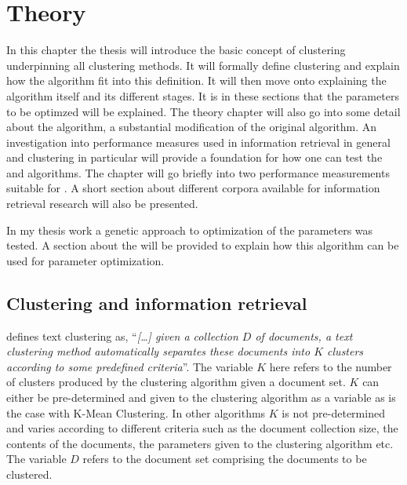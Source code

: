 
\chapter{Theory} %
\label{Theory} %

In this chapter the thesis will introduce the basic concept of clustering underpinning all clustering methods. It will formally define clustering and explain how the \STC algorithm fit into this definition. It will then move onto explaining the \STC algorithm itself and its different stages. It is in these sections that the parameters to be optimzed will be explained. The theory chapter will also go into some detail about the \CTC algorithm, a substantial modification of the original \STC algorithm. An investigation into performance measures used in information retrieval in general and clustering in particular will provide a foundation for how one can test the \STC and \CTC algorithms. The chapter will go briefly into two performance measurements suitable for \CTC. A short section about different corpora available for information retrieval research will also be presented.

In my thesis work a genetic approach to optimization of the parameters was tested. A section about the \GA will be provided to explain how this algorithm can be used for parameter optimization.

\section{Clustering and information retrieval}
\label{Clustering}
\citeauthor[][286]{Baeza-Yates2011a} defines text clustering as, ``\textit{[\dots] given a collection \(D\) of documents, a text clustering method automatically separates these documents into \(K\) clusters according to some predefined criteria}''. The variable \(K\) here refers to the number of clusters produced by the clustering algorithm given a document set. \(K\) can either be pre-determined and given to the clustering algorithm as a variable as is the case with K-Mean Clustering. In other algorithms \(K\) is not pre-determined and varies according to different criteria such as the document collection size, the contents of the documents, the parameters given to the clustering algorithm etc. The variable \(D\) refers to the document set comprising the documents to be clustered.

